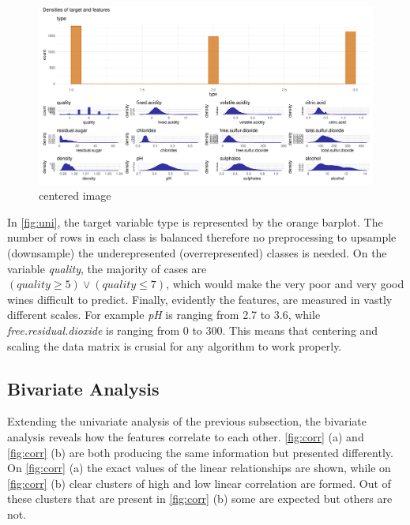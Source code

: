\documentclass[11pt,twoside]{article}
\numberwithin{Theorem}{section}
\numberwithin{Definition}{section}
\numberwithin{Lemma}{section}
\numberwithin{Algorithm}{section}
\numberwithin{equation}{section}
\begin{document}
\vspace*{1em}
\begin{figure}[!h]
\centering
\includegraphics[width=\textwidth]{./output/1.h.univariate-analysis.pdf}
\caption{centered image}
\label{fig:uni}
\end{figure}
\vspace{2em}

In \autoref{fig:uni}, the target variable type is represented by the orange barplot. The number of rows in each class is balanced therefore no preprocessing to upsample (downsample) the underepresented (overrepresented) classes is needed. On the variable \textit{quality}, the majority of cases are \\
 $(quality\geq5) \lor (quality\leq7)$, which would make the very poor and very good wines difficult to predict. Finally, evidently the features, are measured in vastly different scales. For example \textit{pH} is ranging from 2.7 to 3.6, while \textit{free.residual.dioxide} is ranging from 0 to 300. This means that centering and scaling the data matrix is crusial for any algorithm to work properly.

\subsection{Bivariate Analysis}
\label{sec:bivariate}

Extending the univariate analysis of the previous subsection, the bivariate analysis reveals how the features correlate to each other. \autoref{fig:corr} (a) and \autoref{fig:corr} (b) are both producing the same information but presented differently. On \autoref{fig:corr} (a) the exact values of the linear relationships are shown, while on \autoref{fig:corr} (b) clear clusters of high and low linear correlation are formed. Out of these clusters that are present in \autoref{fig:corr} (b) some are expected but others are not.
\end{document}
